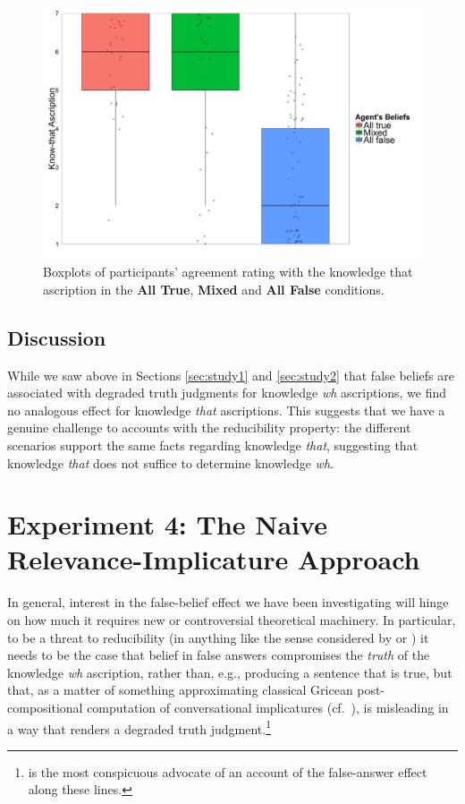 \documentclass[a4paper]{article}
\begin{document}
\begin{figure}[h!]
\centering
\includegraphics[width=14cm] {Fig3}
\captionsetup{width=0.9\textwidth}
\caption{Boxplots of participants' agreement rating with the knowledge that ascription in the \textbf{All True}, \textbf{Mixed} and \textbf{All False} conditions.}
\label{fig:Fig3}
\end{figure}

\subsection{Discussion}

While we saw above in Sections \ref{sec:study1} and \ref{sec:study2} that false beliefs are associated with degraded truth judgments for knowledge \textit{wh} ascriptions, we find no analogous effect for knowledge \textit{that} ascriptions. This suggests that we have a genuine challenge to accounts with the reducibility property: the different scenarios support the same facts regarding knowledge \textit{that}, suggesting that knowledge \textit{that} does not suffice to determine knowledge \textit{wh}.



\section{Experiment 4: The Naive Relevance-Implicature Approach}\label{implicatureTest}

In general, interest in the false-belief effect we have been investigating will hinge on how much it requires new or controversial theoretical machinery. In particular, to be a threat to reducibility (in anything like the sense considered by \citep{george:dis,george:thought} or \citet{kr:11}) it needs to be the case that belief in false answers compromises the \emph{truth} of the knowledge \textit{wh} ascription, rather than, e.g., producing a sentence that is true, but that, as a matter of something approximating classical Gricean post-compositional computation of conversational implicatures (cf.\ \citet{grice1975:logic}), is misleading in a way that renders a degraded truth judgment.\footnote{\citet{berman} is the most conspicuous advocate of an account of the false-answer effect along these lines.}
\end{document}
